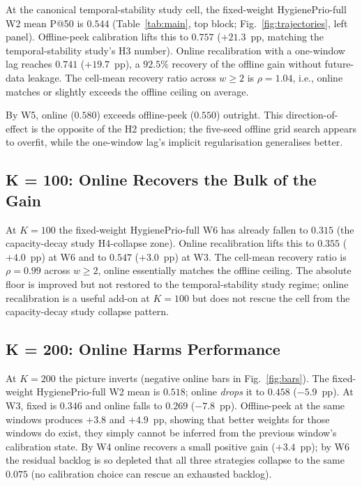 At the canonical temporal-stability study cell, the fixed-weight HygienePrio-full
W2 mean P@50 is $0.544$ (Table~\ref{tab:main}, top block;
Fig.~\ref{fig:trajectories}, left panel). Offline-peek calibration
lifts this to $0.757$ ($+21.3$~pp, matching the temporal-stability study's H3 number).
Online recalibration with a one-window lag reaches $0.741$
($+19.7$~pp), a $92.5\%$ recovery of the offline gain without
future-data leakage.
The cell-mean recovery ratio across $w \geq 2$ is $\rho = 1.04$,
i.e., online matches or slightly exceeds the offline ceiling on
average.

By W5, online ($0.580$) exceeds offline-peek ($0.550$) outright.
This direction-of-effect is the opposite of the H2 prediction; the
five-seed offline grid search appears to overfit, while the
one-window lag's implicit regularisation generalises better.

\subsection{K = 100: Online Recovers the Bulk of the Gain}

At $K = 100$ the fixed-weight HygienePrio-full W6 has already fallen
to $0.315$ (the capacity-decay study H4-collapse zone). Online recalibration lifts
this to $0.355$ ($+4.0$~pp) at W6 and to $0.547$ ($+3.0$~pp) at W3.
The cell-mean recovery ratio is $\rho = 0.99$ across $w \geq 2$, 
online essentially matches the offline ceiling. The absolute floor
is improved but not restored to the temporal-stability study regime; online
recalibration is a useful add-on at $K = 100$ but does not rescue
the cell from the capacity-decay study collapse pattern.

\subsection{K = 200: Online Harms Performance}

At $K = 200$ the picture inverts (negative online bars in
Fig.~\ref{fig:bars}). The fixed-weight HygienePrio-full
W2 mean is $0.518$; online \textit{drops} it to $0.458$ ($-5.9$~pp).
At W3, fixed is $0.346$ and online falls to $0.269$ ($-7.8$~pp).
Offline-peek at the same windows produces $+3.8$ and $+4.9$~pp,
showing that better weights for those windows do exist, they
simply cannot be inferred from the previous window's calibration
state. By W4 online recovers a small positive gain ($+3.4$~pp); by
W6 the residual backlog is so depleted that all three strategies
collapse to the same $0.075$ (no calibration choice can rescue an
exhausted backlog).

